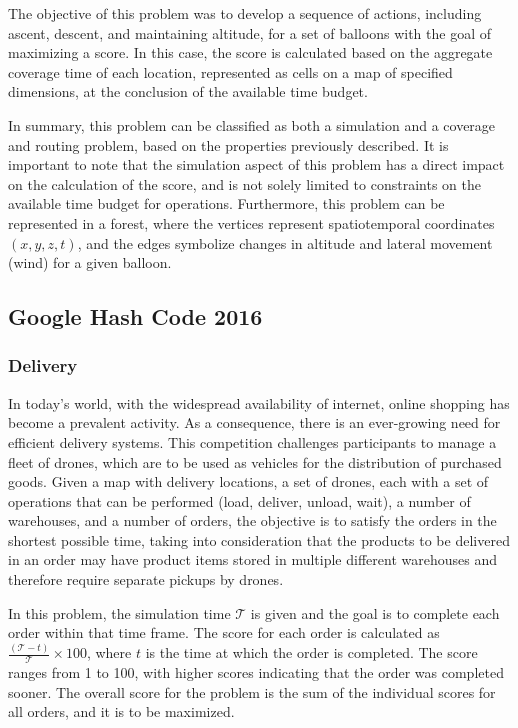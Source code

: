 The objective of this problem was to develop a sequence of actions, including
ascent, descent, and maintaining altitude, for a set of balloons with the goal
of maximizing a score. In this case, the score is calculated based on the
aggregate coverage time of each location, represented as cells on a map of
specified dimensions, at the conclusion of the available time budget.

In summary, this problem can be classified as both a simulation and a coverage
and routing problem, based on the properties previously described. It is
important to note that the simulation aspect of this problem has a direct impact
on the calculation of the score, and is not solely limited to constraints on the
available time budget for operations. Furthermore, this problem can be
represented in a forest, where the vertices represent spatiotemporal coordinates
$(x, y, z, t)$, and the edges symbolize changes in altitude and lateral movement
(wind) for a given balloon.

\subsection{Google Hash Code 2016}
\label{subsec:hashcode-2016}

\subsubsection*{Delivery}
\label{subsubsec:hashcode-2016-qualification}

In today's world, with the widespread availability of internet, online shopping
has become a prevalent activity. As a consequence, there is an ever-growing need
for efficient delivery systems. This competition challenges participants to
manage a fleet of drones, which are to be used as vehicles for the distribution
of purchased goods. Given a map with delivery locations, a set of drones, each
with a set of operations that can be performed (load, deliver, unload, wait), a
number of warehouses, and a number of orders, the objective is to satisfy the
orders in the shortest possible time, taking into consideration that the
products to be delivered in an order may have product items stored in multiple
different warehouses and therefore require separate pickups by drones.

In this problem, the simulation time $\mathcal{T}$ is given and the goal is to
complete each order within that time frame. The score for each order is
calculated as $\frac{(\mathcal{T} - t)}{\mathcal{T}} \times 100$, where $t$ is
the time at which the order is completed. The score ranges from 1 to 100, with
higher scores indicating that the order was completed sooner. The overall score
for the problem is the sum of the individual scores for all orders, and it is to
be maximized.

